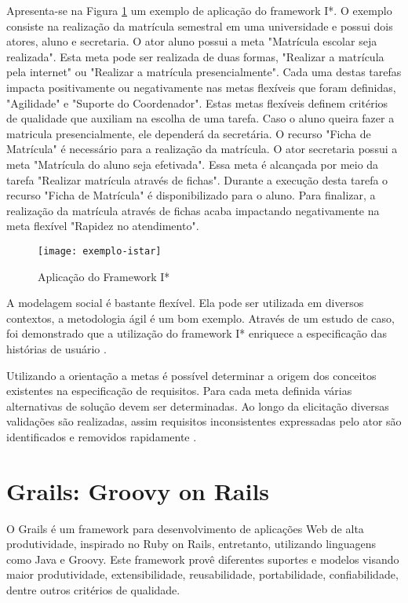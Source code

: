 Apresenta-se na Figura \ref{exemplo-istar} um exemplo de aplicação do framework I*. O exemplo consiste na realização da matrícula semestral em uma universidade e possui dois atores, aluno e secretaria. O ator aluno possui a meta "Matrícula escolar seja realizada". Esta meta pode ser realizada de duas formas, "Realizar a matrícula pela internet" ou "Realizar a matrícula presencialmente". Cada uma destas tarefas impacta positivamente ou negativamente nas metas flexíveis que foram definidas, "Agilidade" e "Suporte do Coordenador". Estas metas flexíveis definem critérios de qualidade que auxiliam na escolha de uma tarefa. Caso o aluno queira fazer a matricula presencialmente, ele dependerá da secretária. O recurso "Ficha de Matrícula" é necessário para a realização da matrícula. O ator secretaria possui a meta "Matrícula do aluno seja efetivada". Essa meta é alcançada	 por meio da tarefa "Realizar matrícula através de fichas". Durante a execução desta tarefa o recurso "Ficha de Matrícula" é disponibilizado para o aluno. Para finalizar, a realização da matrícula através de fichas acaba impactando negativamente na meta flexível "Rapidez no atendimento".

\graphicspath{{figuras/}}
\begin{figure}[H]
\centering
\texttt{[image: exemplo-istar]}
\caption{Aplicação do Framework I*} 
\label{exemplo-istar}
\end{figure}
 
A modelagem social é bastante flexível. Ela pode ser utilizada em diversos contextos, a metodologia ágil é um bom exemplo. Através de um estudo de caso, foi demonstrado que a utilização do framework I* enriquece a especificação das histórias de usuário \cite{jaqueira_2013}.

Utilizando a orientação a metas é possível determinar a origem dos conceitos existentes na especificação de requisitos. Para cada meta definida várias alternativas de solução devem ser determinadas. Ao longo da elicitação diversas validações são realizadas, assim requisitos inconsistentes expressadas pelo ator são identificados e removidos rapidamente \cite{zdra2013}.


\section{Grails: Groovy on Rails}
\label{grails_web}

O Grails é um framework para desenvolvimento de aplicações Web de alta produtividade, inspirado no Ruby on Rails, entretanto, utilizando linguagens como Java e Groovy. Este framework provê diferentes suportes e modelos
visando maior produtividade, extensibilidade, reusabilidade, portabilidade, confiabilidade, dentre outros critérios de qualidade. 	

